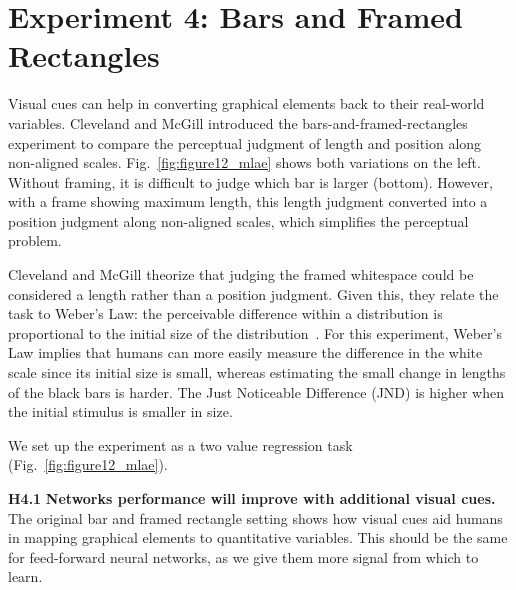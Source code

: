 \section{Experiment 4: Bars and Framed Rectangles}
\label{sec:barsframedrectangles}

Visual cues can help in converting graphical elements back to their real-world variables. Cleveland and McGill introduced the bars-and-framed-rectangles experiment to compare the perceptual judgment of length and position along non-aligned scales. Fig.~\ref{fig:figure12_mlae} shows both variations on the left. Without framing, it is difficult to judge which bar is larger (bottom). However, with a frame showing maximum length, this length judgment  converted into a position judgment along non-aligned scales, which simplifies the perceptual problem.

Cleveland and McGill theorize that judging the framed whitespace could be considered a length rather than a position judgment. Given this, they relate the task to Weber's Law: the perceivable difference within a distribution is proportional to the initial size of the distribution~\cite{householder1940weber}. For this experiment, Weber's Law implies that humans can more easily measure the difference in the white scale since its initial size is small, whereas estimating the small change in lengths of the black bars is harder. The Just Noticeable Difference (JND) is higher when the initial stimulus is smaller in size. 

We set up the experiment as a two value regression task (Fig.~\ref{fig:figure12_mlae}). 


\begin{hypolist}
	\item \textbf{H4.1} \textbf{Networks performance will improve with additional visual cues.} The original bar and framed rectangle setting shows how visual cues aid humans in mapping graphical elements to quantitative variables. This should be the same for feed-forward neural networks, as we give them more signal from which to learn.
\end{hypolist}

